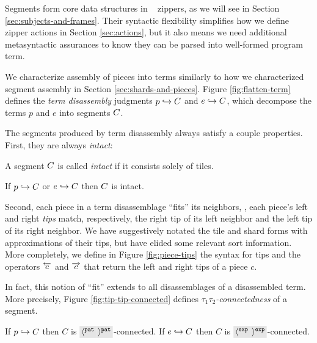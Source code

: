 Segments form core data structures in \ty~ zippers,
as we will see in Section \ref{sec:subjects-and-frames}.
Their syntactic flexibility simplifies how we define
zipper actions in Section
\ref{sec:actions}, but it also means we need additional
metasyntactic assurances to know they can be parsed into
well-formed program term.

We characterize assembly of pieces into terms
similarly to how we characterized segment assembly
in Section \ref{sec:shards-and-pieces}.
Figure \ref{fig:flatten-term} defines the \emph{term
disassembly} judgments $p\hookrightarrow C$
and $e\hookrightarrow C$, which decompose
the terms $p$ and $e$ into segments $C$.



The segments produced by term disassembly always satisfy
a couple properties. First, they are always \emph{intact}:
\begin{definition}
  A segment $C$ is called \emph{intact} if it consists
  solely of tiles.
\end{definition}
\begin{lemma}
  If $p\hookrightarrow C$ or $e\hookrightarrow C$ then $C$ is intact.
\end{lemma}


Second, each piece in a term disassemblage ``fits''
its neighbors, \ie, each piece's left and right \emph{tips}
match, respectively, the right tip of its left neighbor
and the left tip of its right neighbor.
We have suggestively notated the tile and shard forms with
approximations of their tips, but have elided some relevant
sort information.
More completely, we define in Figure \ref{fig:piece-tips}
the syntax for tips and the operators $\overleftarrow{c}$
and $\overrightarrow{c}$ that return the left and right tips
of a piece $c$.



In fact, this notion of ``fit'' extends to all disassemblages
of a disassembled term. 
More precisely, Figure \ref{fig:tip-tip-connected} defines
\emph{$\tau_1\tau_2$-connectedness} of a segment.

\begin{lemma}
  If $p\hookrightarrow C$ then $C$ is $\lltip{\pat}\rrtip{\pat}$-connected.
  If $e\hookrightarrow C$ then $C$ is $\lltip{\expr}\rrtip{\expr}$-connected.
\end{lemma}

